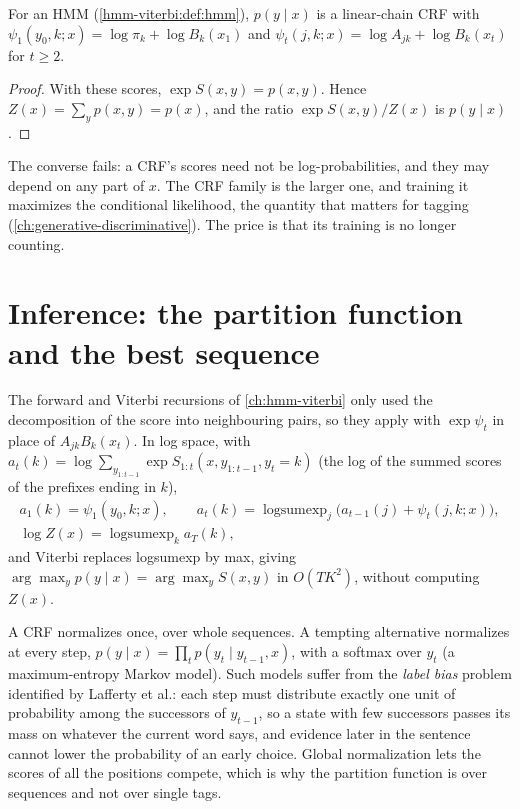 \begin{notechapter}
\begin{proposition}\label{crf:prop:hmm}
For an HMM (\cref{hmm-viterbi:def:hmm}), $p(y\mid x)$ is a linear-chain CRF with
$\psi_1(y_0, k; x) = \log\pi_k + \log B_k(x_1)$ and $\psi_t(j, k; x) = \log A_{jk} + \log B_k(x_t)$ for $t\geq2$.
\end{proposition}

\begin{proof}
With these scores, $\exp S(x, y) = p(x, y)$. Hence $Z(x) = \sum_yp(x, y) = p(x)$, and the
ratio $\exp S(x, y)/Z(x)$ is $p(y\mid x)$.
\end{proof}

The converse fails: a CRF's scores need not be log-probabilities, and they may depend on any
part of $x$. The CRF family is the larger one, and training it maximizes the conditional likelihood,
the quantity that matters for tagging (\cref{ch:generative-discriminative}). The price is that its
training is no longer counting.

\section{Inference: the partition function and the best sequence}\label{crf:sec:inference}

The forward and Viterbi recursions of \cref{ch:hmm-viterbi} only used the decomposition of the
score into neighbouring pairs, so they apply with $\exp\psi_t$ in place of $A_{jk}B_k(x_t)$. In log space, with
$a_t(k) = \log\sum_{y_{1:t-1}}\exp S_{1:t}(x, y_{1:t-1}, y_t = k)$ (the log of the summed scores of the prefixes ending in $k$),
\begin{gather*}
  a_1(k) = \psi_1(y_0, k; x),\qquad a_t(k) = \operatorname{logsumexp}_j\bigl(a_{t-1}(j) + \psi_t(j, k; x)\bigr),\\
  \log Z(x) = \operatorname{logsumexp}_ka_T(k),
\end{gather*}
and Viterbi replaces logsumexp by max, giving $\arg\max_yp(y\mid x) = \arg\max_yS(x, y)$ in $O(TK^2)$, without computing $Z(x)$.

\begin{pitfall}
A CRF normalizes once, over whole sequences. A tempting alternative normalizes at every
step, $p(y\mid x) = \prod_tp(y_t\mid y_{t-1}, x)$, with a softmax over $y_t$ (a maximum-entropy Markov model). Such models suffer from the
\emph{label bias} problem identified by Lafferty et al.: each step must distribute exactly one unit of
probability among the successors of $y_{t-1}$, so a state with few successors passes its mass on
whatever the current word says, and evidence later in the sentence cannot lower the
probability of an early choice. Global normalization lets the scores of all the positions compete,
which is why the partition function is over sequences and not over single tags.
\end{pitfall}


\end{notechapter}
